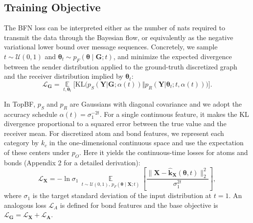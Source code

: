 \documentclass[journal,twoside,web]{ieeecolor}
\begin{document}
\begin{table}
\begin{tabular*}{\textwidth}{@{\extracolsep{\fill}}lccccccccc@{\extracolsep{\fill}}}
    \hline
  \end{tabular*}
  \label{tab:1}
\end{table}


\subsection{Training Objective}
\label{BFN Loss}

The BFN loss can be interpreted either as the number of nats required to transmit the data through the Bayesian flow, or equivalently as the negative variational lower bound over message sequences. Concretely, we sample $t\sim\mathcal{U}(0,1)$ and $\boldsymbol{\theta}_t\sim p_F(\boldsymbol{\theta}\mid \mathbf{G};t)$, and minimize the expected divergence between the sender distribution applied to the ground-truth discretized graph and the receiver distribution implied by $\boldsymbol{\theta}_t$: 
\begin{equation}
\!\mathcal{L}_{\mathbf{G}}
\!=\!
\mathop{\mathbb{E}}\limits_{t,\boldsymbol{\theta}_t}
\Big[
{\mathrm{KL}}\!\Big(
p_S(\mathbf{Y} | \mathbf{G};\alpha(t))
\big\Vert
p_R(\mathbf{Y} | \boldsymbol{\theta}_t; t,\alpha(t))
\Big)
\Big].
\label{eq:bfn_cont_time_kl}
\end{equation}

In TopBF, $p_S$ and $p_R$ are Gaussians with diagonal covariance and we adopt the accuracy schedule $\alpha(t)=\sigma_1^{-2t}$. For a single continuous feature, it makes the KL divergence proportional to a squared error between the true value and the receiver mean. For discretized atom and bond features, we represent each category by $k_c$ in the one-dimensional continuous space and use the expectation of these centers under $p_O$. Here it yields the continuous-time losses for atoms and bonds  (Appendix 2 for a detailed derivation):
\begin{equation}
\label{eq:atom-loss}
    \!\!\mathcal{L}_{\mathbf{X}}
    = - \ln \sigma_{1} \,
    \mathop{\mathbb{E}}\limits_{t \sim \mathcal{U}(0,1),\, p_F(\boldsymbol{\theta} \mid \mathbf{X}; t)}
    \!\!\left[
        \frac{\big\| \mathbf{X} - \hat{\mathbf{k}}_{\mathbf{X}} (\boldsymbol{\theta}, t) \big\|_2^2}
             {\sigma_{1}^{2t}}
    \right],
\end{equation}
where $\sigma_{1}$ is the target standard deviation of the input distribution at $t=1$. An analogous loss $\mathcal{L}_A$ is defined for bond features and the base objective is $ \mathcal{L}_{\mathbf{G}} = \mathcal{L}_{\mathbf{X}} + \mathcal{L}_{\mathbf{A}}$.
\end{document}
